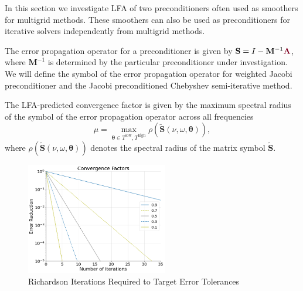 In this section we investigate LFA of two preconditioners often used as smoothers for multigrid methods.
These smoothers can also be used as preconditioners for iterative solvers independently from multigrid methods.

The error propagation operator for a preconditioner is given by $\mathbf{S} = I - \mathbf{M}^{-1} {\color{burgundy}\mathbf{A}}$, where $\mathbf{M}^{-1}$ is determined by the particular preconditioner under investigation.
We will define the symbol of the error propagation operator for weighted Jacobi preconditioner and the Jacobi preconditioned Chebyshev semi-iterative method.

The LFA-predicted convergence factor is given by the maximum spectral radius of the symbol of the error propagation operator across all frequencies
\begin{equation}
\mu = \max_{\boldsymbol{\theta} \in T^{\text{low}}, T^{\text{high}}} \rho \left( \tilde{\mathbf{S}} \left( \nu, \omega, \boldsymbol{\theta} \right) \right),
\end{equation}
where $ \rho \left( \tilde{\mathbf{S}} \left( \nu, \omega, \boldsymbol{\theta} \right)\right)$ denotes the spectral radius of the matrix symbol $\tilde{\mathbf{S}}$.

\begin{figure}[!ht]
  \centering
  \includegraphics[width=0.55\textwidth]{../img/convergenceFactors}
  \caption{Richardson Iterations Required to Target Error Tolerances}
  \label{fig:error_tolerance}
\end{figure}

